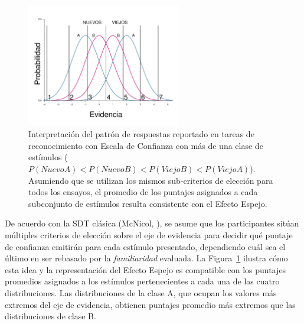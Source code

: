 \begin{itemize}
\begin{figure}[h]
\centering
\includegraphics[width=0.6\textwidth]{Figures/EfectoEspejo_Puntajes}
\decoRule
\caption[Efecto Espejo en tareas de detección con Escala de Confianza]{Interpretación del patrón de respuestas reportado en tareas de reconocimiento con Escala de Confianza con más de una clase de estímulos ($P(NuevoA) < P(NuevoB) < P(ViejoB) < P(ViejoA)$). Asumiendo que se utilizan los mismos sub-criterios de elección para todos los ensayos, el promedio de los puntajes asignados a cada subconjunto de estímulos resulta consistente con el Efecto Espejo.}
\label{fig:Ejem_Efecto_Punt}
\end{figure}

De acuerdo con la SDT clásica (McNicol, \citeyear{McNicol2, McNicol5}), se asume que los participantes sitúan múltiples criterios de elección sobre el eje de evidencia para decidir qué puntaje de confianza emitirán para cada estímulo presentado, dependiendo cuál sea el último en ser rebasado por la \textit{familiaridad} evaluada. La Figura~\ref{fig:Ejem_Efecto_Punt} ilustra cómo esta idea y la representación del Efecto Espejo es compatible con los puntajes promedios asignados a los estímulos pertenecientes a cada una de las cuatro distribuciones. Las distribuciones de la clase A, que ocupan los valores más extremos del eje de evidencia, obtienen puntajes promedio más extremos que las distribuciones de clase B.\\




\end{itemize}
